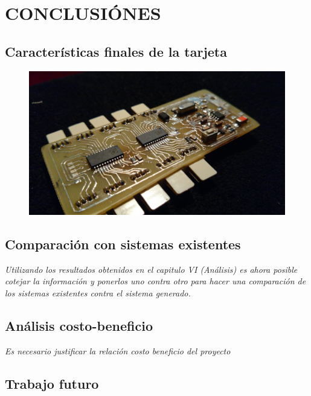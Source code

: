 



\chapter{ CONCLUSIÓNES }

\section{Características finales de la tarjeta}

\begin{figure}[H]
	\begin{center}
 		\includegraphics[width = .65\textwidth]{Tesis/Imagenes/prototipo.jpg}
	\label{prototipo}
    \end{center} 
\end{figure}


\section{ Comparación con sistemas existentes }

\textit{Utilizando los resultados obtenidos en el capitulo VI (Análisis) es ahora posible cotejar la información y ponerlos uno contra otro para hacer una comparación de los sistemas existentes contra el sistema generado.}


\section{ Análisis costo-beneficio }

\textit{Es necesario justificar la relación costo beneficio del proyecto}

\section{ Trabajo futuro }

